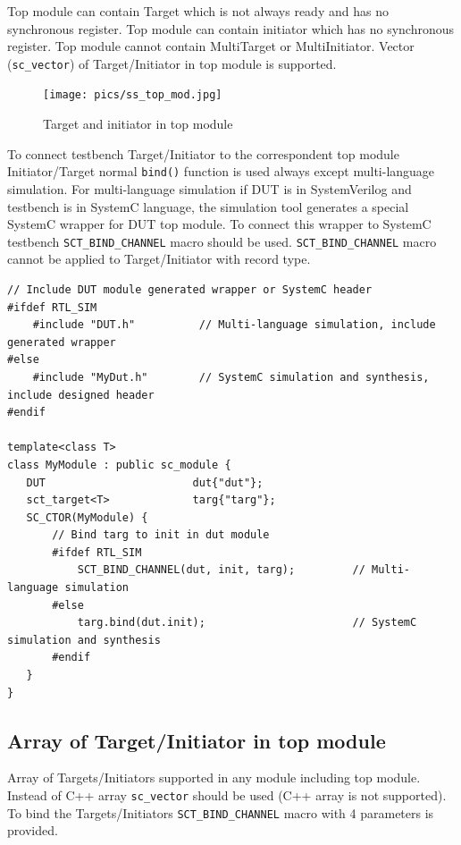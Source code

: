 Top module can contain Target which is not always ready and has no synchronous register. Top module can contain initiator which has no synchronous register. Top module cannot contain MultiTarget or MultiInitiator. Vector ({\tt sc\_vector}) of Target/Initiator in top module is supported.

\begin{figure}[!htb]
\centering
\texttt{[image: pics/ss\_top\_mod.jpg]}
\caption{Target and initiator in top module}
\label{fig:ss_top_mod}
\end{figure}

To connect testbench Target/Initiator to the correspondent top module Initiator/Target normal {\tt bind()} function is used always except multi-language simulation. For multi-language simulation if DUT is in SystemVerilog and testbench is in SystemC language, the simulation tool generates a special SystemC wrapper for DUT top module. To connect this wrapper to SystemC testbench {\tt SCT\_BIND\_CHANNEL} macro should be used. {\tt  SCT\_BIND\_CHANNEL} macro cannot be applied to Target/Initiator with record type.

\begin{lstlisting}[style=mycpp]
// Include DUT module generated wrapper or SystemC header 
#ifdef RTL_SIM
    #include "DUT.h"          // Multi-language simulation, include generated wrapper
#else 
    #include "MyDut.h"        // SystemC simulation and synthesis, include designed header
#endif

template<class T>
class MyModule : public sc_module {
   DUT                       dut{"dut"}; 
   sct_target<T>             targ{"targ"};
   SC_CTOR(MyModule) {
       // Bind targ to init in dut module 
       #ifdef RTL_SIM
           SCT_BIND_CHANNEL(dut, init, targ);         // Multi-language simulation
       #else 
           targ.bind(dut.init);                       // SystemC simulation and synthesis
       #endif
   }
}
\end{lstlisting}

\subsection{Array of Target/Initiator in top module}

Array of Targets/Initiators supported in any module including top module. Instead of C++ array {\tt sc\_vector} should be used (C++ array is not supported). To bind the Targets/Initiators {\tt SCT\_BIND\_CHANNEL} macro with 4 parameters is provided.

